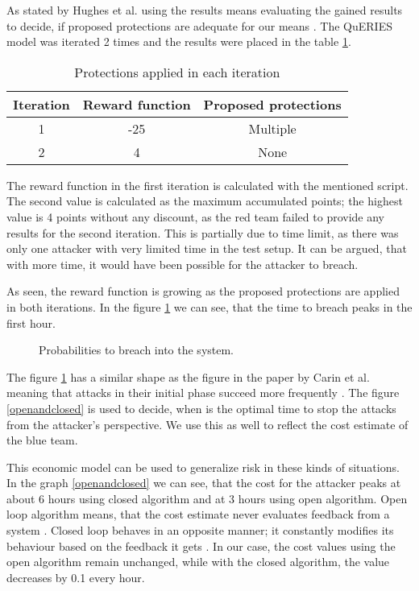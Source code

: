 As stated by Hughes et al. using the results means evaluating
the gained results to decide, if proposed protections are adequate for
our means \cite{hughes2013quantitative}. The QuERIES model was
iterated 2 times and the results were placed in the table \ref{iterationtable}.

\begin{table}[b!]
\centering
\begin{tabular}{|c|c|c|}
  \hline Iteration & Reward function & Proposed protections \\ \hline
  1 & -25 & Multiple \\ \hline 2 & 4 & None \\ \hline
\end{tabular}
\caption{Protections applied in each iteration}
\label{iterationtable}
\end{table}

The reward function in the first iteration is calculated with the
mentioned script. The second value is calculated as the maximum
accumulated points; the highest value is 4 points without any
discount, as the red team failed to provide any results for the second
iteration. This is partially due to time limit, as there was only one
attacker with very limited time in the test setup. It can be argued,
that with more time, it would have been possible for the attacker to
breach.

As seen, the reward function is growing as the proposed protections
are applied in both iterations. In the figure \ref{timetobreach} we can see, that the time to breach peaks in the
first hour.

\begin{figure}[t!]
\centerline{}
\caption{Probabilities to breach into the system.}
\label{timetobreach}
\end{figure}

The figure \ref{timetobreach} has a similar
shape as the figure in the paper by Carin et al. meaning that attacks
in their initial phase succeed more frequently \cite{carin2008cybersecurity}. The figure \ref{openandclosed} is
used to decide, when is the optimal time to stop the attacks from the
attacker's perspective. We use this as well to reflect the cost estimate of
the blue team.

This economic model can be used to generalize risk in these kinds of
situations. In the graph \ref{openandclosed} we can see, that the cost
for the attacker peaks at about 6 hours using closed algorithm and at
3 hours using open algorithm. Open loop algorithm means, that the cost
estimate never evaluates feedback from a system
\cite{bars2006theory}. Closed loop behaves in an opposite manner; it
constantly modifies its behaviour based on the feedback it gets
\cite{bars2006theory}. In our case, the cost values using the open
algorithm remain unchanged, while with the closed algorithm, the value
decreases by 0.1 every hour.

